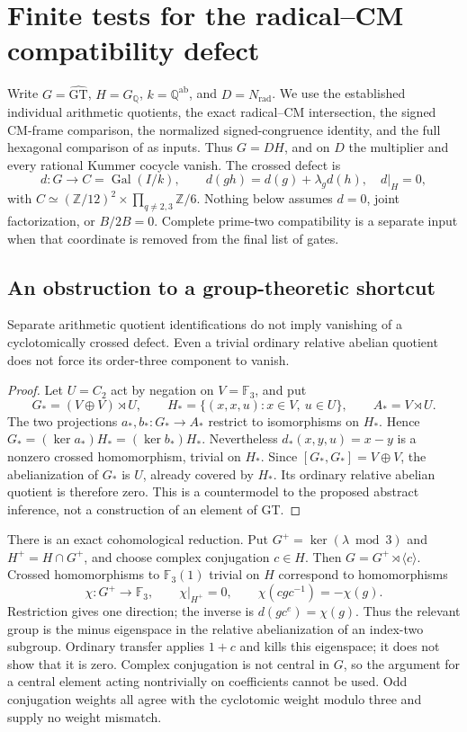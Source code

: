 \section{Finite tests for the radical--CM compatibility defect}
\label{sec:lr-relative-gate}

Write $G=\widehat{\mathrm{GT}}$, $H=G_{\mathbb Q}$,
$k=\mathbb Q^{\mathrm{ab}}$, and $D=N_{\mathrm{rad}}$.
We use the established individual arithmetic quotients, the exact
radical--CM intersection, the signed CM-frame comparison, the normalized
signed-congruence identity, and the full hexagonal comparison of
\cite[Proposition~18]{H17} as inputs. Thus $G=DH$, and on $D$ the
multiplier and every rational Kummer cocycle vanish. The crossed defect is
\[
 d:G\longrightarrow C=\operatorname{Gal}(I/k),\qquad
 d(gh)=d(g)+\lambda_gd(h),\quad d|_H=0,
\]
with $C\simeq(\mathbb Z/12)^2\times\prod_{q\ne2,3}\mathbb Z/6$.
Nothing below assumes $d=0$, joint factorization, or $B/2B=0$.
Complete prime-two compatibility is a separate input when that
coordinate is removed from the final list of gates.

\subsection{An obstruction to a group-theoretic shortcut}

\begin{proposition}\label{prop:lr-abstract-countermodel}
Separate arithmetic quotient identifications do not imply vanishing
of a cyclotomically crossed defect. Even a trivial ordinary relative
abelian quotient does not force its order-three component to vanish.
\end{proposition}
\begin{proof}
Let $U=C_2$ act by negation on $V=\mathbb F_3$, and put
\[
 G_*=(V\oplus V)\rtimes U,\qquad
 H_*=\{(x,x,u):x\in V,\ u\in U\},\qquad A_*=V\rtimes U.
\]
The two projections $a_*,b_*:G_*\to A_*$ restrict to isomorphisms
on $H_*$. Hence $G_*=(\ker a_*)H_*=(\ker b_*)H_*$. Nevertheless
$d_*(x,y,u)=x-y$ is a nonzero crossed homomorphism, trivial on $H_*$.
Since $[G_*,G_*]=V\oplus V$, the abelianization of $G_*$ is $U$,
already covered by $H_*$. Its ordinary relative abelian quotient
is therefore zero. This is a countermodel to the proposed abstract
inference, not a construction of an element of GT.
\end{proof}

There is an exact cohomological reduction. Put
$G^+=\ker(\lambda\bmod3)$ and $H^+=H\cap G^+$, and choose complex
conjugation $c\in H$. Then $G=G^+\rtimes\langle c\rangle$.
Crossed homomorphisms to $\mathbb F_3(1)$ trivial on $H$ correspond
to homomorphisms
\[
 \chi:G^+\longrightarrow\mathbb F_3,\qquad
 \chi|_{H^+}=0,\qquad \chi(cgc^{-1})=-\chi(g).
\]
Restriction gives one direction; the inverse is $d(gc^e)=\chi(g)$.
Thus the relevant group is the minus eigenspace in the relative
abelianization of an index-two subgroup. Ordinary transfer applies
$1+c$ and kills this eigenspace; it does not show that it is zero.
Complex conjugation is not central in $G$, so the argument for a
central element acting nontrivially on coefficients cannot be used.
Odd conjugation weights all agree with the cyclotomic weight modulo
three and supply no weight mismatch.

